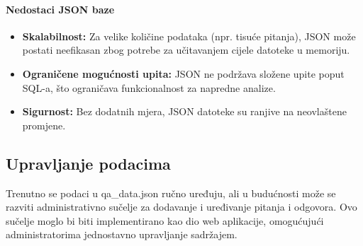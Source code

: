 \paragraph{Nedostaci JSON baze}
\begin{itemize}
    \item \textbf{Skalabilnost:} Za velike količine podataka (npr. tisuće pitanja), JSON može postati neefikasan zbog potrebe za učitavanjem cijele datoteke u memoriju.
    \item \textbf{Ograničene mogućnosti upita:} JSON ne podržava složene upite poput SQL-a, što ograničava funkcionalnost za napredne analize.
    \item \textbf{Sigurnost:} Bez dodatnih mjera, JSON datoteke su ranjive na neovlaštene promjene.
\end{itemize}

\subsection{Upravljanje podacima}
Trenutno se podaci u qa\_data.json ručno uređuju, ali u budućnosti može se razviti administrativno sučelje za dodavanje i uređivanje pitanja i odgovora. Ovo sučelje moglo bi biti implementirano kao dio web aplikacije, omogućujući administratorima jednostavno upravljanje sadržajem.